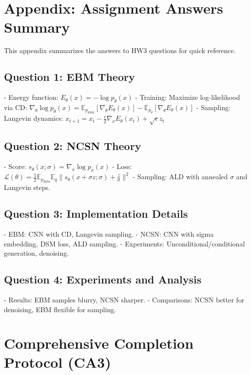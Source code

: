 \documentclass[a4paper,12pt]{article}
\begin{document}
\clearpage
\section{Appendix: Assignment Answers Summary}

This appendix summarizes the answers to HW3 questions for quick reference.

\subsection{Question 1: EBM Theory}
- Energy function: $E_\theta(x) = -\log p_\theta(x)$
- Training: Maximize log-likelihood via CD: $\nabla_\theta \log p_\theta(x) = \mathbb{E}_{p_{data}} [\nabla_\theta E_\theta(x)] - \mathbb{E}_{p_\theta} [\nabla_\theta E_\theta(x)]$
- Sampling: Langevin dynamics: $x_{t+1} = x_t - \frac{\epsilon}{2} \nabla_x E_\theta(x_t) + \sqrt{\epsilon} z_t$

\subsection{Question 2: NCSN Theory}
- Score: $s_\theta(x; \sigma) = \nabla_x \log p_\sigma(x)$
- Loss: $\mathcal{L}(\theta) = \frac{1}{2} \mathbb{E}_{p_{data}} \mathbb{E}_{q} \| s_\theta(x + \sigma z; \sigma) + \frac{z}{\sigma} \|^2$
- Sampling: ALD with annealed $\sigma$ and Langevin steps.

\subsection{Question 3: Implementation Details}
- EBM: CNN with CD, Langevin sampling.
- NCSN: CNN with sigma embedding, DSM loss, ALD sampling.
- Experiments: Unconditional/conditional generation, denoising.

\subsection{Question 4: Experiments and Analysis}
- Results: EBM samples blurry, NCSN sharper.
- Comparisons: NCSN better for denoising, EBM flexible for sampling.

\section{Comprehensive Completion Protocol (CA3)}
\end{document}
